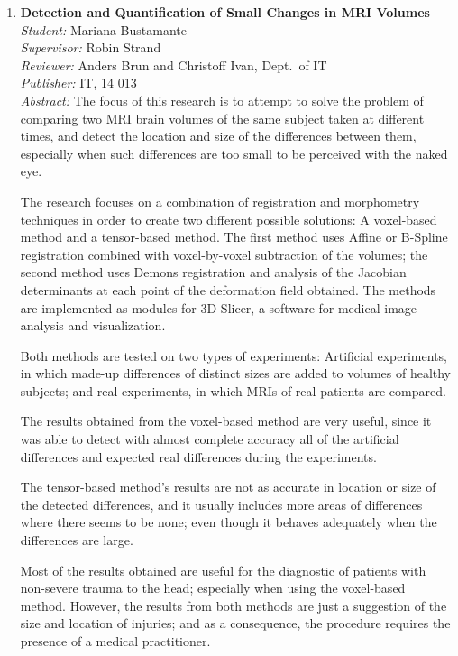 \begin{small}
\begin{enumerate}
\item\textbf{Detection and Quantification of Small Changes in MRI Volumes}\\
  \emph{Student:} Mariana Bustamante\\
  \emph{Supervisor:} Robin Strand\\
  \emph{Reviewer:} Anders Brun and Christoff Ivan, Dept.~of IT\\
  \emph{Publisher:} IT, 14 013\\
  \emph{Abstract:} The focus of this research is to attempt to solve the problem of comparing two MRI brain volumes of the same subject taken at different times, and detect the location and size of the differences between them, especially when such differences are too small to be perceived with the naked eye.

The research focuses on a combination of registration and morphometry techniques in order to create two different possible solutions: A voxel-based method and a tensor-based method. The first method uses Affine or B-Spline registration combined with voxel-by-voxel subtraction of the volumes; the second method uses Demons registration and analysis of the Jacobian determinants at each point of the deformation field obtained. The methods are implemented as modules for 3D Slicer, a software for medical image analysis and visualization.

Both methods are tested on two types of experiments: Artificial experiments, in which made-up differences of distinct sizes are added to volumes of healthy subjects; and real experiments, in which MRIs of real patients are compared.

The results obtained from the voxel-based method are very useful, since it was able to detect with almost complete accuracy all of the artificial differences and expected real differences during the experiments.

The tensor-based method's results are not as accurate in location or size of the detected  differences, and it usually includes more areas of differences where there seems to be none; even though it behaves adequately when the differences are large.

Most of the results obtained are useful for the diagnostic of patients with non-severe trauma to the head; especially when using the voxel-based method. However, the results from both methods are just a suggestion of the size and location of injuries; and as a consequence, the procedure  requires the presence of a medical practitioner.


\end{enumerate}
\end{small}

